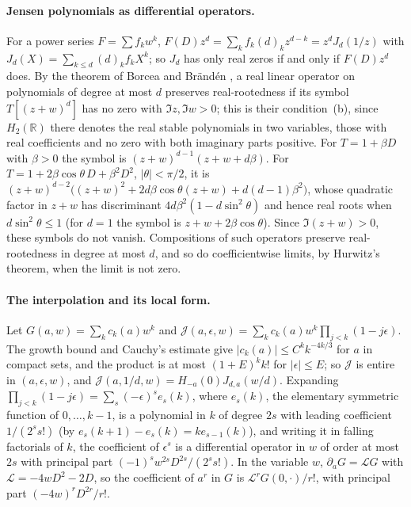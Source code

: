\documentclass[11pt,a4paper]{article}
\theoremstyle{plain}
\theoremstyle{remark}
\newcommand{\R}{\mathbb R}
\begin{document}
\paragraph{Jensen polynomials as differential operators.}
For a power series $F=\sum f_kw^k$, $F(D)z^d=\sum_kf_k(d)_kz^{d-k}=z^dJ_d(1/z)$ with $J_d(X)=\sum_{k\le d}(d)_kf_kX^k$; so
$J_d$ has only real zeros if and only if $F(D)z^d$ does. By the theorem of Borcea and Br\"and\'en
\cite[Theorem~2(b), p.~5]{bb}, a real linear operator on polynomials of degree at most $d$ preserves real-rootedness if
its symbol $T[(z+w)^d]$ has no zero with $\Im z,\Im w>0$; this is their condition~(b), since $H_2(\R)$ there
denotes the real stable polynomials in two variables, those with real coefficients and no zero with both
imaginary parts positive. For $T=1+\beta D$ with $\beta>0$ the symbol is
$(z+w)^{d-1}(z+w+d\beta)$. For $T=1+2\beta\cos\theta\,D+\beta^2D^2$, $|\theta|<\pi/2$, it is
$(z+w)^{d-2}\bigl((z+w)^2+2d\beta\cos\theta(z+w)+d(d-1)\beta^2\bigr)$, whose quadratic factor in $z+w$ has discriminant
$4d\beta^2(1-d\sin^2\theta)$ and hence real roots when $d\sin^2\theta\le1$ (for $d=1$ the symbol is
$z+w+2\beta\cos\theta$). Since $\Im(z+w)>0$, these symbols do not vanish. Compositions of such operators preserve
real-rootedness in degree at most $d$, and so do coefficientwise limits, by Hurwitz's theorem, when the limit is not
zero.

\paragraph{The interpolation and its local form.}
Let $G(a,w)=\sum_kc_k(a)w^k$ and $\mathcal J(a,\epsilon,w)=\sum_kc_k(a)w^k\prod_{j<k}(1-j\epsilon)$. The growth bound and
Cauchy's estimate give $|c_k(a)|\le C^kk^{-4k/3}$ for $a$ in compact sets, and the product is at most $(1+E)^kk!$ for
$|\epsilon|\le E$; so $\mathcal J$ is entire in $(a,\epsilon,w)$, and $\mathcal J(a,1/d,w)=H_{-a}(0)J_{d,a}(w/d)$. Expanding
$\prod_{j<k}(1-j\epsilon)=\sum_s(-\epsilon)^se_s(k)$, where $e_s(k)$, the elementary symmetric function of
$0,\ldots,k-1$, is a polynomial in $k$ of degree $2s$ with leading coefficient $1/(2^ss!)$ (by
$e_s(k+1)-e_s(k)=ke_{s-1}(k)$), and writing it in falling factorials of $k$, the coefficient of $\epsilon^s$ is a
differential operator in $w$ of order at most $2s$ with principal part $(-1)^sw^{2s}D^{2s}/(2^ss!)$. In the variable $w$,
$\partial_aG=\mathcal LG$ with $\mathcal L=-4wD^2-2D$, so the coefficient of $a^r$ in $G$ is $\mathcal L^rG(0,\cdot)/r!$,
with principal part $(-4w)^rD^{2r}/r!$.
\end{document}
